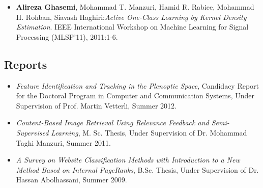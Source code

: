 \documentclass[a4paper]{article}
\theoremstyle{definition}
\begin{document}
\begin{itemize}
\item \textbf{Alireza Ghasemi}, Mohammad T. Manzuri, Hamid R. Rabiee, Mohammad H. Rohban, Siavash Haghiri:\textit{Active One-Class Learning by Kernel Density Estimation}. IEEE International Workshop on Machine Learning for Signal Processing (MLSP'11), 2011:1-6.








\end{itemize}

\subsection{Reports}
\begin{itemize}
\item \emph{Feature Identification and Tracking in the Plenoptic Space}, Candidacy Report for the Doctoral Program in Computer and Communication Systems, Under Supervision of Prof. Martin Vetterli, Summer 2012.
\item \emph{Content-Based Image Retrieval Using Relevance Feedback and Semi-Supervised Learning}, M. Sc. Thesis, Under Supervision of Dr. Mohammad Taghi Manzuri, Summer 2011.
\item \emph{A Survey on Website Classification Methods with Introduction to a  New Method Based on Internal PageRanks}, B.Sc. Thesis, Under Supervision of Dr. Hassan Abolhassani, Summer 2009.


\end{itemize}
\end{document}
